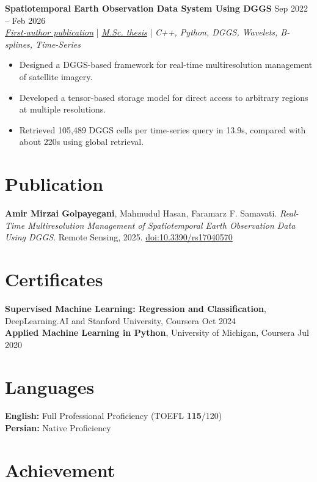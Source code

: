 \documentclass[a4paper,10pt]{article}
\begin{document}
\noindent
\textbf{Spatiotemporal Earth Observation Data System Using DGGS} \hfill Sep 2022 -- Feb 2026 \\
\textit{\href{https://doi.org/10.3390/rs17040570}{First-author publication}} | \textit{\href{https://ucalgary.scholaris.ca/items/114b394b-e516-4732-bd3a-45dd6160d480}{M.Sc. thesis}} | \textit{C++, Python, DGGS, Wavelets, B-splines, Time-Series}
\begin{itemize}[leftmargin=0.25in]
    \item Designed a DGGS-based framework for real-time multiresolution management of satellite imagery.
    \item Developed a tensor-based storage model for direct access to arbitrary regions at multiple resolutions.
    \item Retrieved 105,489 DGGS cells per time-series query in 13.9s, compared with about 220s using global retrieval.
\end{itemize}

\section*{Publication}

\textbf{Amir Mirzai Golpayegani}, Mahmudul Hasan, Faramarz F. Samavati.
\textit{Real-Time Multiresolution Management of Spatiotemporal Earth Observation Data Using DGGS}.
Remote Sensing, 2025. \href{https://doi.org/10.3390/rs17040570}{doi:10.3390/rs17040570}

\section*{Certificates}

\textbf{Supervised Machine Learning: Regression and Classification}, DeepLearning.AI and Stanford University, Coursera \hfill Oct 2024 \\
\textbf{Applied Machine Learning in Python}, University of Michigan, Coursera \hfill Jul 2020

\section*{Languages}

\textbf{English:} Full Professional Proficiency (TOEFL \textbf{115}/120) \\
\textbf{Persian:} Native Proficiency

\section*{Achievement}
\end{document}
